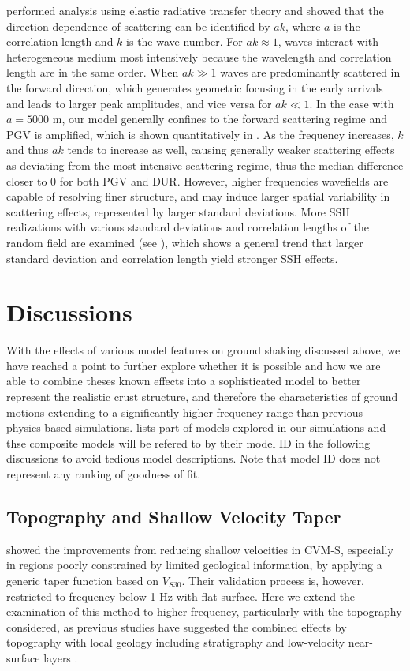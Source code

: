 \citet{przybillaEstimationCrustalScattering2009} performed analysis using elastic radiative transfer theory and showed that the direction dependence of scattering can be identified by $ak$, where $a$ is the correlation length and $k$ is the wave number. For $ak \approx 1$, waves interact with heterogeneous medium most intensively because the wavelength and correlation length are in the same order. When $ak\gg 1$ waves are predominantly scattered in the forward direction, which generates geometric focusing in the early arrivals and leads to larger peak amplitudes, and vice versa for $ak \ll 1$. In the case with $a=5000$ m, our model generally confines to the forward scattering regime and PGV is amplified, which is shown quantitatively in . As the frequency increases, $k$ and thus $ak$ tends to increase as well, causing generally weaker scattering effects as deviating from the most intensive scattering regime, thus the median difference closer to 0 for both PGV and DUR. However, higher frequencies wavefields are capable of resolving finer structure, and may induce larger spatial variability in scattering effects, represented by larger standard deviations. More SSH realizations with various standard deviations and correlation lengths of the random field are examined (see ), which shows a general trend that larger standard deviation and correlation length yield stronger SSH effects.


\section{Discussions}
With the effects of various model features on ground shaking discussed above, we have reached a point to further explore whether it is possible and how we are able to combine theses known effects into a sophisticated model to better represent the realistic crust structure, and therefore the characteristics of ground motions extending to a significantly higher frequency range than previous physics-based simulations.  lists part of models explored in our simulations and thse composite models will be refered to by their model ID in the following discussions to avoid tedious model descriptions. Note that model ID does not represent any ranking of goodness of fit.

\subsection{Topography and Shallow Velocity Taper}\label{highf:topoandtaper}
\citet{huCalibrationNearsurfaceSeismic2021} showed the improvements from reducing shallow velocities in CVM-S, especially in regions poorly constrained by limited geological information, by applying a generic taper function based on $V_{S30}$.
Their validation process is, however, restricted to frequency below 1 Hz with flat surface. Here we extend the examination of this method to higher frequency, particularly with the topography considered, as previous studies have suggested the combined effects by topography with local geology including stratigraphy and low-velocity near-surface layers \citep{lebrun1999experimental,rovelli2002can}.

